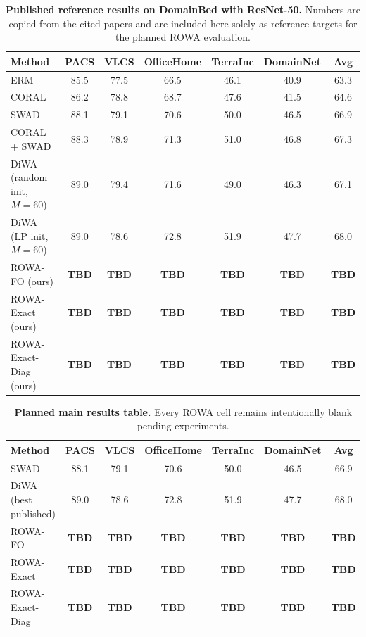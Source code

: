 \documentclass{article}
\newcommand{\TBD}{\textbf{TBD}}
\newcommand{\rowa}{\textup{\textsc{ROWA}}}
\newcommand{\swad}{\textup{\textsc{SWAD}}}
\begin{document}
\begin{table}[t]
    \centering
    \small
    \setlength{\tabcolsep}{5pt}
    \caption{\textbf{Published reference results on DomainBed with ResNet-50.} Numbers are copied from the cited papers and are included here solely as reference targets for the planned \rowa{} evaluation.}
    \label{tab:published}
    \begin{tabular}{lcccccc}
        \toprule
        Method & PACS & VLCS & OfficeHome & TerraInc & DomainNet & Avg \\
        \midrule
        ERM \citep{cha2021wad,rame2022diwa} & 85.5 & 77.5 & 66.5 & 46.1 & 40.9 & 63.3 \\
        CORAL \citep{rame2022diwa} & 86.2 & 78.8 & 68.7 & 47.6 & 41.5 & 64.6 \\
        \swad{} \citep{cha2021wad} & 88.1 & 79.1 & 70.6 & 50.0 & 46.5 & 66.9 \\
        CORAL + \swad{} \citep{cha2021wad} & 88.3 & 78.9 & 71.3 & 51.0 & 46.8 & 67.3 \\
        DiWA (random init, $M=60$) \citep{rame2022diwa} & 89.0 & 79.4 & 71.6 & 49.0 & 46.3 & 67.1 \\
        DiWA (LP init, $M=60$) \citep{rame2022diwa} & 89.0 & 78.6 & 72.8 & 51.9 & 47.7 & 68.0 \\
        \midrule
        \rowa{}-FO (ours) & \TBD & \TBD & \TBD & \TBD & \TBD & \TBD \\
        \rowa{}-Exact (ours) & \TBD & \TBD & \TBD & \TBD & \TBD & \TBD \\
        \rowa{}-Exact-Diag (ours) & \TBD & \TBD & \TBD & \TBD & \TBD & \TBD \\
        \bottomrule
    \end{tabular}
\end{table}

\begin{table}[t]
    \centering
    \small
    \caption{\textbf{Planned main results table.} Every \rowa{} cell remains intentionally blank pending experiments.}
    \label{tab:main_tbd}
    \begin{tabular}{lcccccc}
        \toprule
        Method & PACS & VLCS & OfficeHome & TerraInc & DomainNet & Avg \\
        \midrule
        \swad{} & 88.1 & 79.1 & 70.6 & 50.0 & 46.5 & 66.9 \\
        DiWA (best published) & 89.0 & 78.6 & 72.8 & 51.9 & 47.7 & 68.0 \\
        \rowa{}-FO & \TBD & \TBD & \TBD & \TBD & \TBD & \TBD \\
        \rowa{}-Exact & \TBD & \TBD & \TBD & \TBD & \TBD & \TBD \\
        \rowa{}-Exact-Diag & \TBD & \TBD & \TBD & \TBD & \TBD & \TBD \\
        \bottomrule
    \end{tabular}
\end{table}
\end{document}

